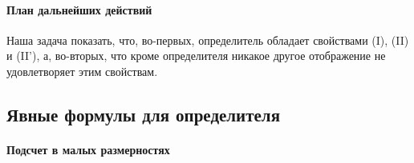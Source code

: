 \paragraph{План дальнейших действий} 

Наша задача показать, что, во-первых, определитель обладает свойствами (I), (II) и (II'), а, во-вторых, что кроме определителя никакое другое отображение не удовлетворяет этим свойствам.


\subsection{Явные формулы для определителя}

\paragraph{Подсчет в малых размерностях}

